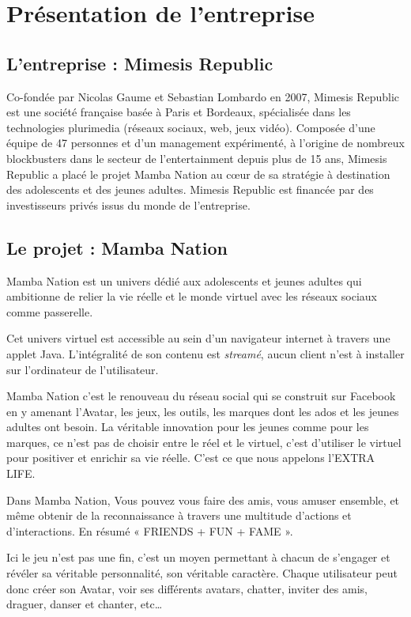 \chapter{Présentation de l'entreprise}

\section{L'entreprise : Mimesis Republic}

Co-fondée par Nicolas Gaume et Sebastian Lombardo en 2007, Mimesis Republic est
une société française basée à Paris et Bordeaux, spécialisée dans les
technologies plurimedia (réseaux sociaux, web, jeux vidéo). Composée d’une
équipe de 47 personnes et d’un management expérimenté, à l’origine de nombreux
blockbusters dans le secteur de l’entertainment depuis plus de 15 ans, Mimesis
Republic a placé le projet Mamba Nation au cœur de sa stratégie à destination
des adolescents et des jeunes adultes. Mimesis Republic est financée par des
investisseurs privés issus du monde de l’entreprise.

\section{Le projet : Mamba Nation}

Mamba Nation est un univers dédié aux adolescents et jeunes adultes qui
ambitionne de relier la vie réelle et le monde virtuel avec les réseaux sociaux
comme passerelle.

Cet univers virtuel est accessible au sein d'un navigateur internet à travers
une applet Java. L'intégralité de son contenu est \textit{streamé}, aucun client n'est à
installer sur l'ordinateur de l'utilisateur.

Mamba Nation c’est le renouveau du réseau social qui se construit sur Facebook
en y amenant l’Avatar, les jeux, les outils, les marques dont les ados et les
jeunes adultes ont besoin.
La véritable innovation pour les jeunes comme pour les marques, ce n’est pas de
choisir entre le réel et le virtuel, c’est d’utiliser le virtuel pour positiver
et enrichir sa vie réelle. C’est ce que nous appelons l’EXTRA LIFE.

Dans Mamba Nation, Vous pouvez vous faire des amis, vous amuser ensemble, et
même obtenir de la reconnaissance à travers une multitude d’actions et
d’interactions. En résumé «  FRIENDS + FUN + FAME ».

Ici le jeu n’est pas une fin, c’est un moyen permettant à chacun de s’engager et
révéler sa véritable personnalité, son véritable caractère.
Chaque utilisateur peut donc créer son Avatar, voir ses différents avatars,
chatter, inviter des amis, draguer, danser et chanter, etc…

